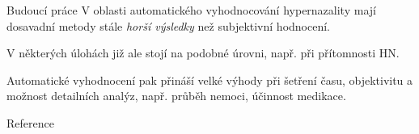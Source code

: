 \documentclass{beamer}
\begin{document}
  \begin{frame}{Budoucí práce}
  	V oblasti automatického vyhodnocování hypernazality mají dosavadní metody stále \emph{horší výsledky} než subjektivní hodnocení.

	V některých úlohách již ale stojí na podobné úrovni, např. při přítomnosti HN.
	
	 Automatické vyhodnocení pak přináší velké výhody při šetření času, 
	objektivitu a možnost detailních analýz, např. průběh nemoci, účinnost medikace.
  \end{frame}

  \appendix
  
  \begin{frame}{Reference}
  	
  	 
	 
  	
  \end{frame}
\end{document}
